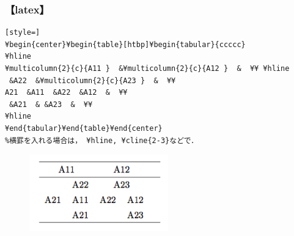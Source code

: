 \subsubsection{【latex】}\begin{lstlisting}[style=]
¥begin{center}¥begin{table}[htbp]¥begin{tabular}{ccccc}
¥hline
¥multicolumn{2}{c}{A11 }  &¥multicolumn{2}{c}{A12 }  &  ¥¥ ¥hline
 &A22  &¥multicolumn{2}{c}{A23 }  &  ¥¥
A21  &A11  &A22  &A12  &  ¥¥
 &A21  & &A23  &  ¥¥
¥hline
¥end{tabular}¥end{table}¥end{center}
%横罫を入れる場合は， ¥hline, ¥cline{2-3}などで．
\end{lstlisting}
\begin{figure}[htbp]\begin{center}
\includegraphics[width=6cm]{./table.png}
\caption{}
\label{default}\end{center}\end{figure}
